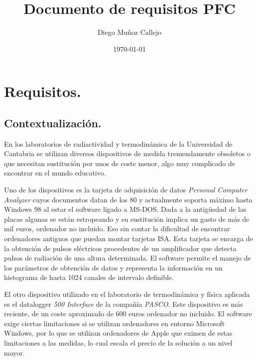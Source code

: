 \documentclass[11pt, a4paper, twoside, titlepage]{book}
\author{Diego Muñoz Callejo}
\title{Documento de requisitos PFC}
\date{\today}
\begin{document}
\chapter*{Requisitos.}
	\section*{Contextualización.}
	En los laboratorios de radiactividad y termodinámica de la Universidad de Cantabria se utilizan diversos dispositivos de medida tremendamente obsoletos o que necesitan 	sustitución por unos de coste menor, algo muy complicado de encontrar en el mundo educativo.

	Uno de los dispositivos es la tarjeta de adquisición de datos \emph{Personal Computer Analyzer} cuyos documentos datan de los 80 y actualmente soporta máximo hasta Windows 98 al estar el software ligado a MS-DOS. Dada a la antigüedad de las placas algunas se están estropeando y su sustitución implica un gasto de más de mil euros, ordenador no incluido. Eso sin contar la dificultad de encontrar ordenadores antiguos que puedan montar tarjetas ISA. Esta tarjeta se encarga de la obtención de pulsos eléctricos procedentes de un amplificador que detecta pulsos de radiación de una altura determinada. El software permite el manejo de los parámetros de obtención de datos y representa la información en un histograma de hasta 1024 canales de intervalo definible.

	El otro dispositivo utilizado en el laboratorio de termodinámica y física aplicada es el datalogger \emph{500 Interface} de la compañía \emph{PASCO}. Este dispositivo es más reciente, de un coste aproximado de 600 euros ordenador no incluido. El software exige ciertas limitaciones si se utilizan ordenadores en entorno Microsoft Windows, por lo que se utilizan ordenadores de Apple que eximen de estas limitaciones a las medidas, lo cual escala el precio de la solución a un nivel mayor.

\pagebreak
\end{document}
